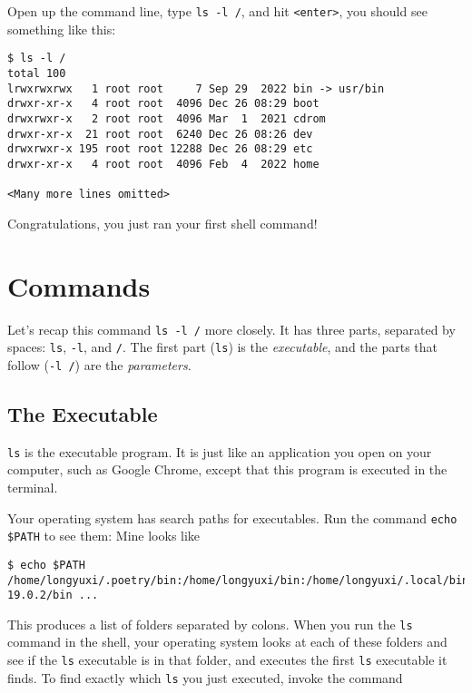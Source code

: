 \documentclass[12pt,letterpaper]{article}
\begin{document}
Open up the command line, type \texttt{ls -l /}, and hit \texttt{<enter>}, you should see something like this:


\begin{verbatim}
$ ls -l /
total 100
lrwxrwxrwx   1 root root     7 Sep 29  2022 bin -> usr/bin
drwxr-xr-x   4 root root  4096 Dec 26 08:29 boot
drwxrwxr-x   2 root root  4096 Mar  1  2021 cdrom
drwxr-xr-x  21 root root  6240 Dec 26 08:26 dev
drwxrwxr-x 195 root root 12288 Dec 26 08:29 etc
drwxr-xr-x   4 root root  4096 Feb  4  2022 home

<Many more lines omitted>
\end{verbatim}

Congratulations, you just ran your first shell command!

\section{Commands}

Let's recap this command \texttt{ls -l /} more closely. It has three parts, separated by spaces: \texttt{ls}, \texttt{-l}, and \texttt{/}. The first part (\texttt{ls}) is the \textit{executable}, and the parts that follow (\texttt{-l /}) are the \textit{parameters}.

\subsection{The Executable}

\texttt{ls} is the executable program. It is just like an application you open on your computer, such as Google Chrome, except that this program is executed in the terminal.

Your operating system has search paths for executables. Run the command \texttt{echo \$PATH} to see them: Mine looks like

\begin{verbatim}
$ echo $PATH
/home/longyuxi/.poetry/bin:/home/longyuxi/bin:/home/longyuxi/.local/bin:/usr/local/sbin:/usr/local/bin:/usr/sbin:/usr/bin:/sbin:/bin:/usr/games:/usr/local/games:/snap/bin:/home/longyuxi/bin:/home/longyuxi/java/jdk-19.0.2/bin ...
\end{verbatim}

This produces a list of folders separated by colons. When you run the \texttt{ls} command in the shell, your operating system looks at each of these folders and see if the \texttt{ls} executable is in that folder, and executes the first \texttt{ls} executable it finds. To find exactly which \texttt{ls} you just executed, invoke the command
\end{document}
